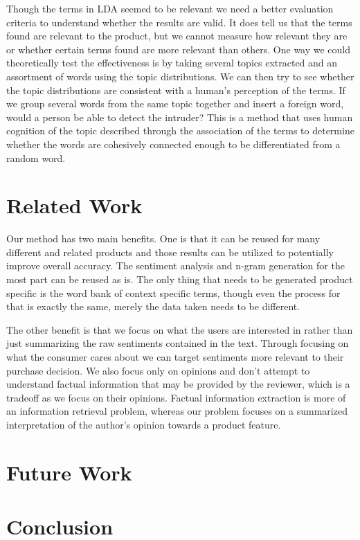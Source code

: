 \documentclass{article}
\begin{document}
Though the terms in LDA seemed to be relevant we need a better evaluation criteria to understand whether the results are valid. It does tell us that the terms found are relevant to the product, but we cannot measure how relevant they are or whether certain terms found are more relevant than others. One way we could theoretically test the effectiveness is by taking several topics extracted and an assortment of words using the topic distributions. We can then try to see whether the topic distributions are consistent with a human's perception of the terms. If we group several words from the same topic together and insert a foreign word, would a person be able to detect the intruder? This is a method that uses human cognition of the topic described through the association of the terms to determine whether the words are cohesively connected enough to be differentiated from a random word.

\section{Related Work}
Our method has two main benefits. One is that it can be reused for many different and related products and those results can be utilized to potentially improve overall accuracy. The sentiment analysis and n-gram generation for the most part can be reused as is. The only thing that needs to be generated product specific is the word bank of context specific terms, though even the process for that is exactly the same, merely the data taken needs to be different.

The other benefit is that we focus on what the users are interested in rather than just summarizing the raw sentiments contained in the text. Through focusing on what the consumer cares about we can target sentiments more relevant to their purchase decision. We also focus only on opinions and don’t attempt to understand factual information that may be provided by the reviewer, which is a tradeoff as we focus on their opinions. Factual information extraction is more of an information retrieval problem, whereas our problem focuses on a summarized interpretation of the author’s opinion towards a product feature.

\section{Future Work}
\section{Conclusion}
\end{document}
